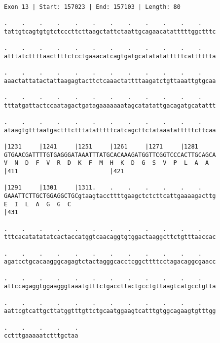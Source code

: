 \documentclass{article}
\begin{document}
\begin{Verbatim}
Exon 13 | Start: 157023 | End: 157103 | Length: 80
 
.    .    .    .    .    .    .    .    .    .    .    .    
tattgtcagtgtgtctcccttcttaagctattctaattgcagaacatatttttggctttc
  
.    .    .    .    .    .    .    .    .    .    .    .    
atttatcttttaacttttctcctgaaacatcagtgatgcatatatatttttcatttttta
  
.    .    .    .    .    .    .    .    .    .    .    .    
aaactattatactattaagagtacttctcaaactattttaagatctgttaaattgtgcaa
  
.    .    .    .    .    .    .    .    .    .    .    .    
tttatgattactccaatagactgatagaaaaaaatagcatatattgacagatgcatattt
  
.    .    .    .    .    .    .    .    .    .    .    .    
ataagtgtttaatgactttctttatatttttcatcagcttctataaatatttttcttcaa
  
|1231     |1241     |1251     |1261     |1271     |1281     
GTGAACGATTTTGTGAGGGATAAATTTATGCACAAAGATGGTTCGGTCCCACTTGCAGCA
V  N  D  F  V  R  D  K  F  M  H  K  D  G  S  V  P  L  A  A  
|411                          |421                          
  
|1291     |1301     |1311.    .    .    .    .    .    .    
GAAATTCTTGCTGGAGGCTGCgtaagtaccttttgaagctctcttcattgaaaagacttg
E  I  L  A  G  G  C                                         
|431                                                        
  
.    .    .    .    .    .    .    .    .    .    .    .    
tttcacatatatatcactaccatggtcaacaggtgtggactaaggcttctgtttaaccac
  
.    .    .    .    .    .    .    .    .    .    .    .    
agatcctgcacaagggcagagtctactagggcacctcggcttttcctagacaggcgaacc
  
.    .    .    .    .    .    .    .    .    .    .    .    
attccagaggtggaagggtaaatgtttctgaccttactgcctgttaagtcatgcctgtta
  
.    .    .    .    .    .    .    .    .    .    .    .    
aattcgtcattgcttatggtttgttctgcaatggaagtcatttgtggcagaagtgtttgg
  
.    .    .    .    .
cctttgaaaaatctttgctaa
\end{Verbatim}
\newpage
\end{document}
